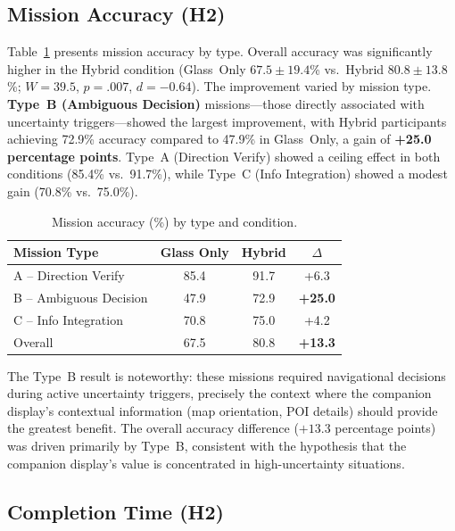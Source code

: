 \documentclass[review]{vgtc}           %
\begin{document}
\subsection{Mission Accuracy (H2)}

Table~\ref{tab:accuracy} presents mission accuracy by type. Overall
accuracy was significantly higher in the Hybrid condition (Glass~Only
$67.5 \pm 19.4$\% vs.\ Hybrid $80.8 \pm 13.8$\%;
$W = 39.5$, $p = .007$, $d = -0.64$). The improvement varied
by mission type. \textbf{Type~B (Ambiguous Decision)}
missions---those directly associated with uncertainty
triggers---showed the largest improvement, with Hybrid participants
achieving 72.9\% accuracy compared to 47.9\% in Glass~Only, a gain
of \textbf{+25.0 percentage points}. Type~A (Direction Verify) showed
a ceiling effect in both conditions (85.4\% vs.\ 91.7\%), while
Type~C (Info Integration) showed a modest gain (70.8\% vs.\ 75.0\%).

\begin{table}[t]
  \centering
  \caption{Mission accuracy (\%) by type and condition.}
  \label{tab:accuracy}
  \small
  \begin{tabular}{lccc}
    \toprule
    Mission Type & Glass Only & Hybrid & $\Delta$ \\
    \midrule
    A -- Direction Verify & 85.4 & 91.7 & +6.3 \\
    B -- Ambiguous Decision & 47.9 & 72.9 & \textbf{+25.0} \\
    C -- Info Integration & 70.8 & 75.0 & +4.2 \\
    \midrule
    Overall & 67.5 & 80.8 & \textbf{+13.3} \\
    \bottomrule
  \end{tabular}
\end{table}

The Type~B result is noteworthy: these missions required navigational
decisions during active uncertainty triggers, precisely the context
where the companion display's contextual information (map orientation,
POI details) should provide the greatest benefit. The overall
accuracy difference ($+13.3$ percentage points) was driven primarily
by Type~B, consistent with the hypothesis that the companion display's
value is concentrated in high-uncertainty situations.

\subsection{Completion Time (H2)}
\end{document}
